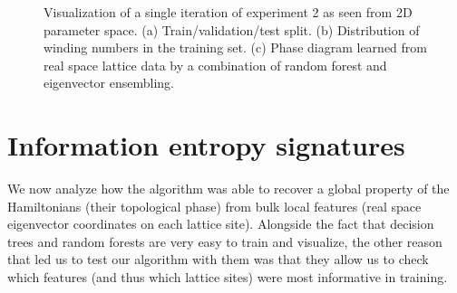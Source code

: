 \documentclass[10pt]{revtex4-1}
\begin{document}
\begin{figure}
\centering
{}\quad
{}
\caption{Visualization of a single iteration of experiment 2 as seen from 2D parameter space. (a) Train/validation/test split. (b) Distribution of winding numbers in the training set. (c) Phase diagram learned from real space lattice data by a combination of random forest and eigenvector ensembling.}
\label{figexp2_exp}
\end{figure}

\section*{Information entropy signatures}

We now analyze how the algorithm was able to recover a global property of the Hamiltonians (their topological phase) from bulk local features (real space eigenvector coordinates on each lattice site). Alongside the fact that decision trees and random forests are very easy to train and visualize, the other reason that led us to test our algorithm with them was that they allow us to check which features (and thus which lattice sites) were most informative in training.
\end{document}
